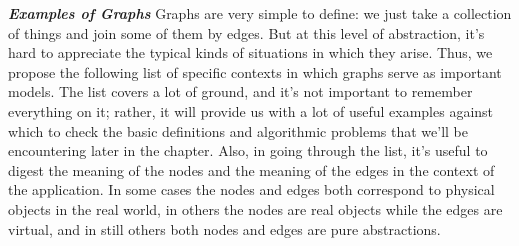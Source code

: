 \documentclass[12pt,a4paper]{book}
\begin{document}
\textbf{\textit{Examples of Graphs}} Graphs are very simple to define: we just take a collection of things and join some of them by edges. But at this level of abstraction, it's hard to appreciate the typical kinds of situations in which they arise. Thus, we propose the following list of specific contexts in which graphs serve as important models. The list covers a lot of ground, and it's not important to remember everything on it; rather, it will provide us with a lot of useful examples against which to check the basic definitions and algorithmic problems that we'll be encountering later in the chapter. Also, in going through the list, it's useful to digest the meaning of the nodes and the meaning of the edges in the context of the application. In some cases the nodes and edges both correspond to physical objects in the real world, in others the nodes are real objects while the edges are virtual, and in still others both nodes and edges are pure abstractions.
\end{document}
